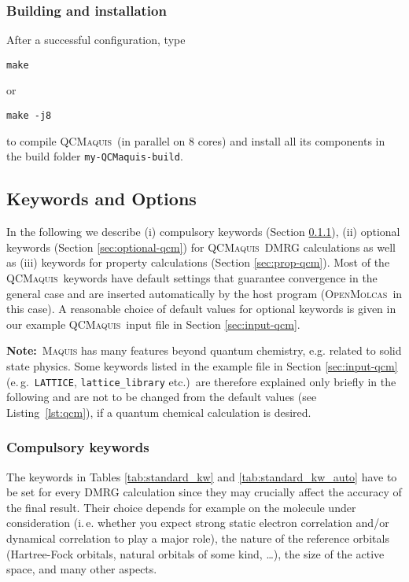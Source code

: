 \documentclass[bibliography=totoc,12pt,a4paper]{scrartcl}
\newcommand{\mol}{\textsc{OpenMolcas}}
\newcommand{\qcm}{\textsc{QCMaquis}}
\newcommand{\hostp}{\mol}
\newcommand{\qcmbuild}{\texttt{my-QCMaquis-build}}
\newcommand{\kwd}[1]{\texttt{#1}}
\begin{document}
\subsubsection{Building and installation}\label{subsubsec:build-stand}

After a successful configuration, type
\begin{verbatim}
make
\end{verbatim}
\noindent or
\begin{verbatim}
make -j8
\end{verbatim}
to compile \qcm\ (in parallel on 8 cores) and install all its components in the build folder \texttt{\qcmbuild}.

\subsection{Keywords and Options}\label{sec:qcmaquis-kw}

In the following we describe (i) compulsory keywords (Section \ref{sec:compul-qcm}), (ii)
optional keywords (Section \ref{sec:optional-qcm}) for \qcm\ DMRG calculations as well as (iii)
keywords for property calculations (Section \ref{sec:prop-qcm}).
Most of the \qcm\ keywords have default settings that guarantee convergence in the general case and are inserted automatically
by the host program (\hostp\ in this case). A reasonable choice of default values for optional keywords is given in our
example \qcm\ input file in Section \ref{sec:input-qcm}.

\begin{framed}
\noindent\textbf{Note:}\ \textsc{Maquis} has many features beyond quantum chemistry, e.g. related to solid state physics.
Some keywords listed in the example file in Section \ref{sec:input-qcm} (e.\,g.\ \kwd{LATTICE}, \kwd{lattice\_library} etc.)\ are therefore explained only briefly in the following
and are not to be changed from the default values (see Listing~\ref{lst:qcm}), if a quantum chemical calculation is desired.
\end{framed}

\subsubsection{Compulsory keywords}\label{sec:compul-qcm}

The keywords in Tables \ref{tab:standard_kw} and \ref{tab:standard_kw_auto} have to be set for every DMRG calculation since they may crucially affect the accuracy of the final result.
Their choice depends for example on the molecule under consideration
(i.\,e. whether you expect strong static electron correlation and/or dynamical correlation to play a major role),
the nature of the reference orbitals (Hartree-Fock orbitals, natural orbitals of some kind, \ldots), the size of the
active space, and many other aspects.
\end{document}
